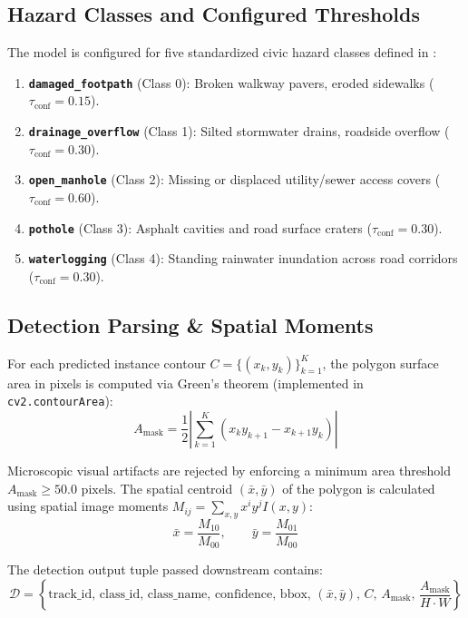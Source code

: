 \documentclass[12pt,a4paper]{article}
\begin{document}
\subsection{Hazard Classes and Configured Thresholds}
The model is configured for five standardized civic hazard classes defined in :
\begin{enumerate}[leftmargin=1.8em, itemsep=0.1em]
    \item \textbf{\texttt{damaged\_footpath}} (Class 0): Broken walkway pavers, eroded sidewalks ($\tau_{\text{conf}} = 0.15$).
    \item \textbf{\texttt{drainage\_overflow}} (Class 1): Silted stormwater drains, roadside overflow ($\tau_{\text{conf}} = 0.30$).
    \item \textbf{\texttt{open\_manhole}} (Class 2): Missing or displaced utility/sewer access covers ($\tau_{\text{conf}} = 0.60$).
    \item \textbf{\texttt{pothole}} (Class 3): Asphalt cavities and road surface craters ($\tau_{\text{conf}} = 0.30$).
    \item \textbf{\texttt{waterlogging}} (Class 4): Standing rainwater inundation across road corridors ($\tau_{\text{conf}} = 0.30$).
\end{enumerate}

\subsection{Detection Parsing \& Spatial Moments}
For each predicted instance contour $C = \{(x_k, y_k)\}_{k=1}^K$, the polygon surface area in pixels is computed via Green's theorem (implemented in \texttt{cv2.contourArea}):
\begin{equation}
A_{\text{mask}} = \frac{1}{2} \left| \sum_{k=1}^K (x_k y_{k+1} - x_{k+1} y_k) \right|
\end{equation}

Microscopic visual artifacts are rejected by enforcing a minimum area threshold $A_{\text{mask}} \ge 50.0\text{ pixels}$. The spatial centroid $(\bar{x}, \bar{y})$ of the polygon is calculated using spatial image moments $M_{ij} = \sum_{x, y} x^i y^j I(x, y)$:
\begin{equation}
\bar{x} = \frac{M_{10}}{M_{00}}, \qquad \bar{y} = \frac{M_{01}}{M_{00}}
\end{equation}

The detection output tuple passed downstream contains:
\begin{equation}
\mathcal{D} = \left\{ \text{track\_id}, \, \text{class\_id}, \, \text{class\_name}, \, \text{confidence}, \, \text{bbox}, \, (\bar{x}, \bar{y}), \, C, \, A_{\text{mask}}, \, \frac{A_{\text{mask}}}{H \cdot W} \right\}
\end{equation}
\end{document}
